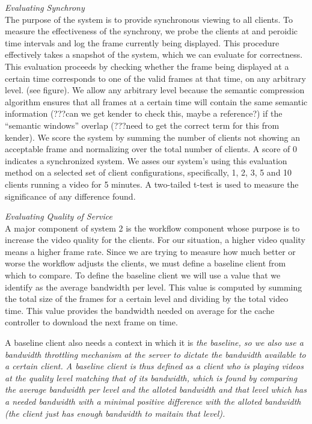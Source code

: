 \documentclass[10pt]{article}
\begin{document}
\textit{Evaluating Synchrony} \\ The purpose of the system is to
provide synchronous viewing to all clients.  To measure the
effectiveness of the synchrony, we probe the clients at and peroidic
time intervals and log the frame currently being displayed.  This
procedure effectively takes a snapshot of the system, which we can
evaluate for correctness.  This evaluation proceeds by checking
whether the frame being displayed at a certain time corresponds to one
of the valid frames at that time, on any arbitrary level.  (see
figure).  We allow any arbitrary level because the semantic
compression algorithm ensures that all frames at a certain time will
contain the same semantic information (???can we get kender to check
this, maybe a reference?) if the ``semantic windows'' overlap (???need
to get the correct term for this from kender).  We score the system by
summing the number of clients not showing an acceptable frame and
normalizing over the total number of clients.  A score of 0 indicates
a synchronized system.  We asses our system's using this evaluation
method on a selected set of client configurations, specifically, 1, 2,
3, 5 and 10 clients running a video for 5 minutes.  A two-tailed
t-test is used to measure the significance of any difference found.

\textit{Evaluating Quality of Service} \\
A major component of system 2 is the workflow component whose purpose
is to increase the video quality for the clients.  For our situation,
a higher video quality means a higher frame rate.  Since we are trying
to measure how much better or worse the workflow adjusts the clients,
we must define a baseline client from which to compare.  To define the
baseline client we will use a value that we identify as the average
bandwidth per level.  This value is computed by summing the total size
of the frames for a certain level and dividing by the total video
time.  This value provides the bandwidth needed on average for the
cache controller to download the next frame on time.

A baseline client also needs a context in which it is \em{the}
baseline, so we also use a bandwidth throttling mechanism
\cite{shaperd} at the server to dictate the bandwidth available to a
certain client.  A baseline client is thus defined as a client who is
playing videos at the quality level matching that of its bandwidth,
which is found by comparing the average bandwidth per level and the
alloted bandwidth and that level which has a needed bandwidth with a
minimal positive difference with the alloted bandwidth (the client
just has enough bandwidth to maitain that level).  
\end{document}

